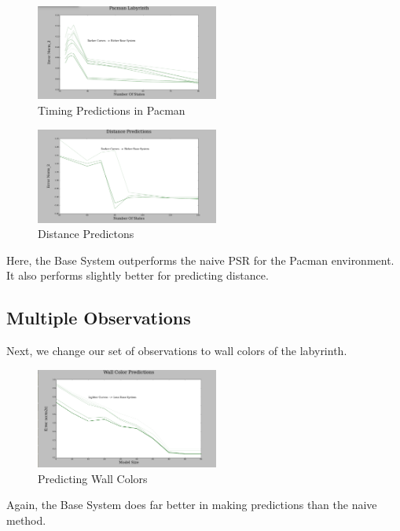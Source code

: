 \documentclass{acm_proc_article-sp}
\begin{document}
\begin{figure}[ht!]
\centering
\includegraphics[width=60mm]{lucasplots/monImages/PacmanLabyrinth.png}
\caption{Timing Predictions in Pacman \label{overflow}}
\end{figure}

\begin{figure}[ht!]
\centering
\includegraphics[width=60mm]{lucasplots/monImages/Distance_Predictions.png}
\caption{Distance Predictons\label{overflow}}
\end{figure}

Here, the Base System outperforms the naive PSR for the Pacman environment. It also performs slightly better for predicting distance. 

\subsection{Multiple Observations}

Next, we change our set of observations to wall colors of the labyrinth. 

\begin{figure}[ht!]
\centering
\includegraphics[width=60mm]{lucasplots/monImages/WallColorPredictions.png}
\caption{Predicting Wall Colors \label{overflow}}
\end{figure}

Again, the Base System does far better in making predictions than the naive method.

\end{document}
